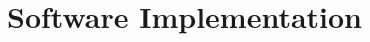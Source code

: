 \chapter{Software Implementation}
\begin{comment}
This section deals in particular with your contributions to the thesis and may be subdivided into the following points, if necessary:

\begin{itemize}
	\item Analysis of current situation
	\item Results of patent reviews
	\item Description of state-of-the-art technology
	\begin{itemize}
		\item Review of literature with direct connection
		\item Information on existing solutions for aspects of the problem
		\item Discussion of the relevance with respect to your work
		\item Demonstration of your expertise in the area
		\item Factual presentation preferred
		\item Not just a listing of facts!
	\end{itemize}
	\item Presentation of target specifications for the actual state
	\item Calculations
	\item Tables and diagrams
	\item Concept development
	\item Principle sketches and/or construction drawings
	\item Prototype development
	\item Problem solution and test results (especially your contributions towards the problem solution; presentation of results as detailed as necessary):
	\begin{itemize}
		\item Analyses of initial situation and determination of approach to the problem
		\item Development of the concept and of the basic approach
		\item Detailed presentation of the development of solutions with all calculations, constructions, programme steps, tables and diagrams, \etc
	\end{itemize}
	\item Results, findings and innovation
	\item Evaluations, \etc
\end{itemize}	
The original ideas, innovations and technological developments must be explained and presented with appropriate detail.


\end{comment}

